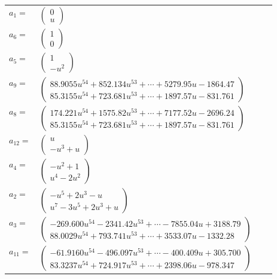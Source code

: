 \documentclass[1p]{elsarticle_modified}
\theoremstyle{definition}
\begin{document}
\begin{tabular}{m{7pt} m{180pt} m{7pt} m{180pt} }
\flushright $a_{1}=$&$\begin{pmatrix}0\\u\end{pmatrix}$ \\
\flushright $a_{6}=$&$\begin{pmatrix}1\\0\end{pmatrix}$ \\
\flushright $a_{5}=$&$\begin{pmatrix}1\\- u^2\end{pmatrix}$ \\
\flushright $a_{9}=$&$\begin{pmatrix}88.9055 u^{54}+852.134 u^{53}+\cdots+5279.95 u-1864.47\\85.3155 u^{54}+723.681 u^{53}+\cdots+1897.57 u-831.761\end{pmatrix}$ \\
\flushright $a_{8}=$&$\begin{pmatrix}174.221 u^{54}+1575.82 u^{53}+\cdots+7177.52 u-2696.24\\85.3155 u^{54}+723.681 u^{53}+\cdots+1897.57 u-831.761\end{pmatrix}$ \\
\flushright $a_{12}=$&$\begin{pmatrix}u\\- u^3+u\end{pmatrix}$ \\
\flushright $a_{4}=$&$\begin{pmatrix}- u^2+1\\u^4-2 u^2\end{pmatrix}$ \\
\flushright $a_{2}=$&$\begin{pmatrix}- u^5+2 u^3- u\\u^7-3 u^5+2 u^3+u\end{pmatrix}$ \\
\flushright $a_{3}=$&$\begin{pmatrix}-269.600 u^{54}-2341.42 u^{53}+\cdots-7855.04 u+3188.79\\88.0029 u^{54}+793.741 u^{53}+\cdots+3533.07 u-1332.28\end{pmatrix}$ \\
\flushright $a_{11}=$&$\begin{pmatrix}-61.9160 u^{54}-496.097 u^{53}+\cdots-400.409 u+305.700\\83.3237 u^{54}+724.917 u^{53}+\cdots+2398.06 u-978.347\end{pmatrix}$ \\

\end{tabular}
\end{document}
